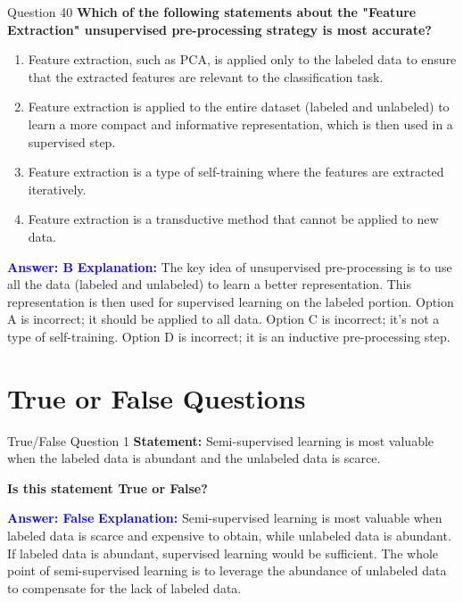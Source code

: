 \documentclass{beamer}
\begin{document}
	\begin{frame}{Question 40}
		\textbf{Which of the following statements about the "Feature Extraction" unsupervised pre-processing strategy is most accurate?}
		\begin{enumerate}
			\item Feature extraction, such as PCA, is applied only to the labeled data to ensure that the extracted features are relevant to the classification task.
			\item Feature extraction is applied to the entire dataset (labeled and unlabeled) to learn a more compact and informative representation, which is then used in a supervised step.
			\item Feature extraction is a type of self-training where the features are extracted iteratively.
			\item Feature extraction is a transductive method that cannot be applied to new data.
		\end{enumerate}
		\vspace{0.2cm}
		\textcolor{blue}{\textbf{Answer: B}}
		\vspace{0.2cm}
		\textcolor{blue}{\textbf{Explanation:}} The key idea of unsupervised pre-processing is to use all the data (labeled and unlabeled) to learn a better representation. This representation is then used for supervised learning on the labeled portion. Option A is incorrect; it should be applied to all data. Option C is incorrect; it's not a type of self-training. Option D is incorrect; it is an inductive pre-processing step.
	\end{frame}
	
	\section{True or False Questions}
	
	\begin{frame}{True/False Question 1}
		\textbf{Statement:} Semi-supervised learning is most valuable when the labeled data is abundant and the unlabeled data is scarce.
		
		\vspace{0.3cm}
		\textbf{Is this statement True or False?}
		
		\vspace{0.2cm}
		\textcolor{blue}{\textbf{Answer: False}}
		\vspace{0.2cm}
		\textcolor{blue}{\textbf{Explanation:}} Semi-supervised learning is most valuable when labeled data is scarce and expensive to obtain, while unlabeled data is abundant. If labeled data is abundant, supervised learning would be sufficient. The whole point of semi-supervised learning is to leverage the abundance of unlabeled data to compensate for the lack of labeled data.
	\end{frame}
	
\end{document}
